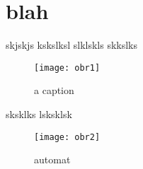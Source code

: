 \documentclass{article}
\begin{document}
\section{blah}
skjskjs kskslksl
slklskls skkslks
\begin{figure}
\begin{center}
\texttt{[image: obr1]}
\caption{a caption}
\end{center}
\end{figure}
sksklks
lsksklsk
\begin{figure}
\begin{center}
\texttt{[image: obr2]}
\caption{automat}
\end{center}
\end{figure}
\end{document}
